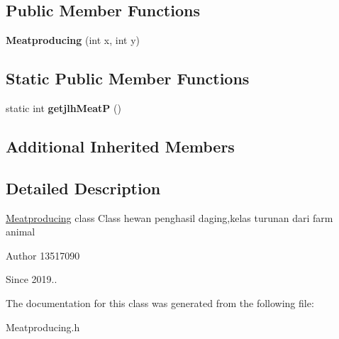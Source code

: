 \subsection*{Public Member Functions}
\begin{DoxyCompactItemize}
\item 
\mbox{\label{classMeatproducing_a5f7d6e507dd62044029052e805cd37dd}} 
{\bfseries Meatproducing} (int x, int y)
\end{DoxyCompactItemize}
\subsection*{Static Public Member Functions}
\begin{DoxyCompactItemize}
\item 
\mbox{\label{classMeatproducing_ad3370dd411d1a8c60ad0a8ee42c9308e}} 
static int {\bfseries getjlh\+MeatP} ()
\end{DoxyCompactItemize}
\subsection*{Additional Inherited Members}


\subsection{Detailed Description}
\hyperlink{classMeatproducing}{Meatproducing} class Class hewan penghasil daging,kelas turunan dari farm animal \begin{DoxyAuthor}{Author}
13517090 
\end{DoxyAuthor}
\begin{DoxySince}{Since}
2019.. 
\end{DoxySince}


The documentation for this class was generated from the following file\+:\begin{DoxyCompactItemize}
\item 
Meatproducing.\+h\end{DoxyCompactItemize}
